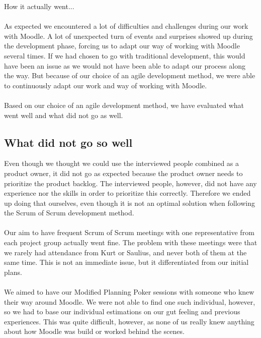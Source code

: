 
How it actually went...

\paragraph{}
As expected we encountered a lot of difficulties and challenges during our work with Moodle.
A lot of unexpected turn of events and surprises showed up during the development phase, forcing us to adapt our way of working with Moodle several times.
If we had chosen to go with traditional development, this would have been an issue as we would not have been able to adapt our process along the way. 
But because of our choice of an agile development method, we were able to continuously adapt our work and way of working with Moodle.

\paragraph{}
Based on our choice of an agile development method, we have evaluated what went well and what did not go as well. 

\subsection{What did not go so well}
Even though we thought we could use the interviewed people combined as a product owner, it did not go as expected because the product owner needs to prioritize the product backlog.
The interviewed people, however, did not have any experience nor the skills in order to prioritize this correctly. 
Therefore we ended up doing that ourselves, even though it is not an optimal solution when following the Scrum of Scrum development method.

\paragraph{}
Our aim to have frequent Scrum of Scrum meetings with one representative from each project group actually went fine. 
The problem with these meetings were that we rarely had attendance from Kurt or Saulius, and never both of them at the same time.
This is not an immediate issue, but it differentiated from our initial plans.

\paragraph{}
We aimed to have our Modified Planning Poker sessions with someone who knew their way around Moodle.
We were not able to find one such individual, however, so we had to base our individual estimations on our gut feeling and previous experiences. 
This was quite difficult, however, as none of us really knew anything about how Moodle was build or worked behind the scenes. 

